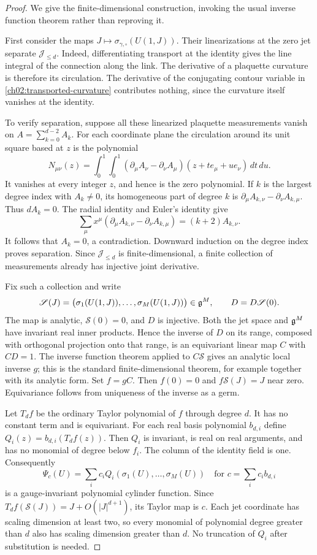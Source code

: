 \begin{proof}
We give the finite-dimensional construction, invoking the usual inverse
function theorem rather than reproving it.

First consider the maps $J\mapsto\sigma_{\gamma,\square}(U(1,J))$.
Their linearizations at the zero jet separate $\mathcal J_{\le d}$.
Indeed, differentiating transport at the identity gives the line integral
of the connection along the link. The derivative of a plaquette curvature
is therefore its circulation. The derivative of the conjugating contour variable
in \eqref{ch02:transported-curvature} contributes nothing, since the
curvature itself vanishes at the identity.

To verify separation, suppose all these linearized plaquette measurements
vanish on $A=\sum_{k=0}^{d-2}A_k$. For each coordinate plane the circulation
around its unit square based at $z$ is the polynomial
\[
 N_{\mu\nu}(z)=\int_0^1\!\int_0^1
 (\partial_\mu A_\nu-\partial_\nu A_\mu)
                  (z+te_\mu+ue_\nu)\,dt\,du.
\]
It vanishes at every integer $z$, and hence is the zero polynomial. If $k$
is the largest degree index with $A_k\ne0$, its homogeneous part of degree
$k$ is $\partial_\mu A_{k,\nu}-\partial_\nu A_{k,\mu}$. Thus $dA_k=0$.
The radial identity and Euler's identity give
\[
 \sum_\mu x^\mu
  (\partial_\mu A_{k,\nu}-\partial_\nu A_{k,\mu})=(k+2)A_{k,\nu}.
\]
It follows that $A_k=0$, a contradiction. Downward induction on the degree
index proves separation. Since $\mathcal J_{\le d}$ is finite-dimensional,
a finite collection of measurements already has injective joint derivative.

Fix such a collection and write
\[
 \mathscr S(J)=\bigl(\sigma_1(U(1,J)),\ldots,
                          \sigma_M(U(1,J))\bigr)\in\mathfrak g^M,
 \qquad D=D\mathscr S(0).
\]
The map is analytic, $\mathscr S(0)=0$, and $D$ is injective. Both the jet
space and $\mathfrak g^M$ have invariant real inner products. Hence the inverse
of $D$ on its range, composed with orthogonal projection onto that range,
is an equivariant linear map $C$ with $CD=1$. The inverse function theorem
applied to $C\mathscr S$ gives an analytic local inverse $g$; this is the
standard finite-dimensional theorem, for example
\cite[Theorem~9.24]{Rudin1976} together with its analytic form.
Set $f=gC$. Then $f(0)=0$ and $f\mathscr S(J)=J$ near zero.
Equivariance follows from uniqueness of the inverse as a germ.

Let $T_df$ be the ordinary Taylor polynomial of $f$ through degree $d$.
It has no constant term and is equivariant. For each real basis polynomial
$b_{d,i}$ define $Q_i(z)=b_{d,i}(T_df(z))$. Then $Q_i$ is invariant, is real
on real arguments, and has no monomial of degree below $f_i$. The column of the
identity field is one. Consequently
\[
 \Psi_c(U)=\sum_i c_iQ_i(\sigma_1(U),\ldots,\sigma_M(U))
 \quad\text{for }c=\sum_i c_i b_{d,i}
\]
is a gauge-invariant polynomial cylinder function. Since
$T_df(\mathscr S(J))=J+O(|J|^{d+1})$, its Taylor map is $c$.
Each jet coordinate has scaling dimension at least two, so every monomial
of polynomial degree greater than $d$ also has scaling dimension greater
than $d$. No truncation of $Q_i$ after substitution is
needed.


\end{proof}
